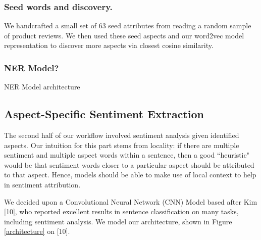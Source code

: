 \documentclass{article} %
\begin{document}
\subsubsection{Seed words and discovery.} We handcrafted a small set of 63 seed attributes from reading a random sample of product reviews. We then used these seed aspects and our word2vec model representation to discover more aspects via closest cosine similarity.

\subsubsection{NER Model?}

NER Model architecture


\subsection{Aspect-Specific Sentiment Extraction}

The second half of our workflow involved sentiment analysis given identified aspects. Our intuition for this part stems from locality: if there are multiple sentiment and multiple aspect words within a sentence, then a good ``heuristic" would be that sentiment words closer to a particular aspect should be attributed to that aspect. Hence, models should be able to make use of local context to help in sentiment attribution.

We decided upon a Convolutional Neural Network (CNN) Model based after Kim [10], who reported excellent results in sentence classification on many tasks, including sentiment analysis. We model our architecture, shown in Figure \ref{architecture} on [10].


\end{document}
